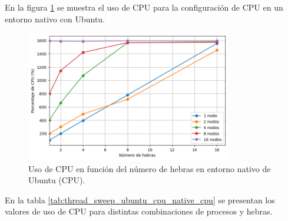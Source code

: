 En la figura \ref{fig:thread_sweep_ubuntu_cpu_native_cpu} se muestra el uso de CPU para la configuración de CPU en un entorno nativo con Ubuntu.

\begin{figure}[ht]
    \centering
    \includegraphics[width=0.8\textwidth]{imagenes/cap5/thread_sweep_ubuntu_cpu_native_cpu.png}
    \caption{Uso de CPU en función del número de hebras en entorno nativo de Ubuntu (CPU).}
    \label{fig:thread_sweep_ubuntu_cpu_native_cpu}
\end{figure}

En la tabla \ref{tab:thread_sweep_ubuntu_cpu_native_cpu} se presentan los valores de uso de CPU para distintas combinaciones de procesos y hebras.

